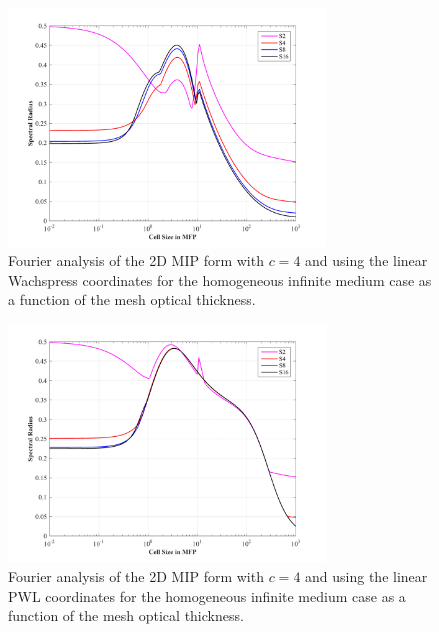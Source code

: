 \begin{figure}
\centering
\includegraphics[width=0.75\textwidth]{figures/sec_DSA/SI_MIP_quad_C=4_Wachspress1_LS2,4,8,16.png}
\caption{Fourier analysis of the 2D MIP form with $c=4$ and using the linear Wachspress coordinates for the homogeneous infinite medium case as a function of the mesh optical thickness.}
\label{fig::DSA_1G_Fourier_Wach1}
\end{figure}

\begin{figure}
\centering
\includegraphics[width=0.75\textwidth]{figures/sec_DSA/SI_MIP_quad_C=4_PWLD1_LS2,4,8,16.png}
\caption{Fourier analysis of the 2D MIP form with $c=4$ and using the linear PWL coordinates for the homogeneous infinite medium case as a function of the mesh optical thickness.}
\label{fig::DSA_1G_Fourier_PWL1}
\end{figure}

